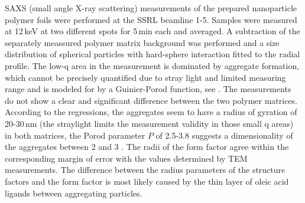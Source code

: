 SAXS (small angle X-ray scattering) measurements of the prepared nanoparticle polymer foils were performed at the SSRL beamline 1-5. Samples were measured at 12\,keV  at two different spots for 5\,min each and averaged. A subtraction of the separately meassured polymer matrix background was performed and a size distribution of spherical particles with hard-sphere interaction fitted to the radial profile. The low-q area in the measurement is dominated by aggregate formation, which cannot be precisely quantified due to stray light and limited measuring range and is modeled for by a Guinier-Porod function, see   \cite{percus1958,feigin1987,Ilavsky2009}.
The measurements do not show a clear and significant difference between the two polymer matrices. According to the regressions, the aggregates seem to have a radius of gyration of 20-30\,nm (the straylight limits the measurement validity in those small q areas) in both matrices, the Porod parameter $P$ of 2.5-3.8 suggests a dimensionality of the aggregates between 2 and 3 \cite{feigin1987,lili2005}. The radii of the form factor agree within the corresponding margin of error with the values determined by TEM measurements. The difference between the radius parameters of the structure factors and the form factor is most likely caused by the thin layer of oleic acid ligands between aggregating particles.

